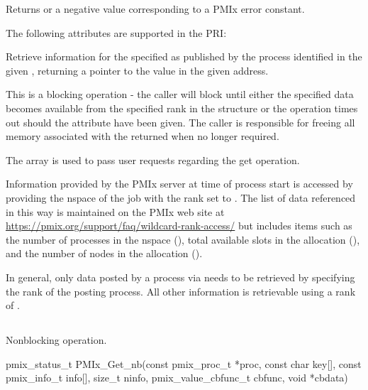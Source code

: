 Returns  or a negative value corresponding to a PMIx error constant.

\priattr
The following attributes are supported in the \ac{PRI}:



\descr

Retrieve information for the specified  as published by the process identified in the given , returning a pointer to the value in the given address.

This is a blocking operation - the caller will block until either the specified data becomes available from the specified rank in the  structure or the operation times out should the  attribute have been given.
The caller is responsible for freeing all memory associated with the returned  when no longer required.

The  array is used to pass user requests regarding the get operation.

\adviceuserstart
Information provided by the \ac{PMIx} server at time of process start is accessed by providing the nspace of the job with the rank set to . The list of data referenced in this way is maintained on the \ac{PMIx} web site at \url{https://pmix.org/support/faq/wildcard-rank-access/} but includes items such as the number of processes in the nspace (), total available slots in the allocation (), and the number of nodes in the allocation ().

In general, only data posted by a process via  needs to be retrieved by specifying the rank of the posting process. All other information is retrievable using a rank of .
\adviceuserend

\subsection{}

\summary

Nonblocking  operation.

\format

\cspecificstart
\begin{codepar}
pmix_status_t
PMIx_Get_nb(const pmix_proc_t *proc, const char key[],
            const pmix_info_t info[], size_t ninfo,
            pmix_value_cbfunc_t cbfunc, void *cbdata)
\end{codepar}
\cspecificend


